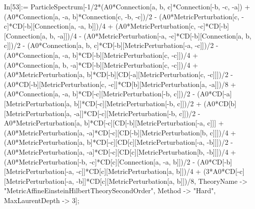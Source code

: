In[53]:= ParticleSpectrum[-1/2*(A0*Connection[a, b, c]*Connection[-b, -c, -a]) + (A0*Connection[a, -a, b]*Connection[c, -b, -c])/2 - (A0*MetricPerturbation[c, -c]*CD[-b][Connection[a, -a, b]])/4 + (A0*MetricPerturbation[c, -c]*CD[-b][Connection[a, b, -a]])/4 - (A0*MetricPerturbation[-a, -c]*CD[-b][Connection[a, b, c]])/2 - (A0*Connection[a, b, c]*CD[-b][MetricPerturbation[-a, -c]])/2 - (A0*Connection[a, -a, b]*CD[-b][MetricPerturbation[c, -c]])/4 + (A0*Connection[a, b, -a]*CD[-b][MetricPerturbation[c, -c]])/4 + (A0*MetricPerturbation[a, b]*CD[-b][CD[-a][MetricPerturbation[c, -c]]])/2 - (A0*CD[-b][MetricPerturbation[c, -c]]*CD[b][MetricPerturbation[a, -a]])/8 + (A0*Connection[a, -a, b]*CD[-c][MetricPerturbation[-b, c]])/2 - (A0*CD[-a][MetricPerturbation[a, b]]*CD[-c][MetricPerturbation[-b, c]])/2 + (A0*CD[b][MetricPerturbation[a, -a]]*CD[-c][MetricPerturbation[-b, c]])/2 - A0*MetricPerturbation[a, b]*CD[-c][CD[-b][MetricPerturbation[-a, c]]] + (A0*MetricPerturbation[a, -a]*CD[-c][CD[-b][MetricPerturbation[b, c]]])/4 + (A0*MetricPerturbation[a, b]*CD[-c][CD[c][MetricPerturbation[-a, -b]]])/2 - (A0*MetricPerturbation[a, -a]*CD[-c][CD[c][MetricPerturbation[b, -b]]])/4 + (A0*MetricPerturbation[-b, -c]*CD[c][Connection[a, -a, b]])/2 - (A0*CD[-b][MetricPerturbation[-a, -c]]*CD[c][MetricPerturbation[a, b]])/4 + (3*A0*CD[-c][MetricPerturbation[-a, -b]]*CD[c][MetricPerturbation[a, b]])/8, TheoryName -> "MetricAffineEinsteinHilbertTheorySecondOrder", Method -> "Hard", MaxLaurentDepth -> 3]; 